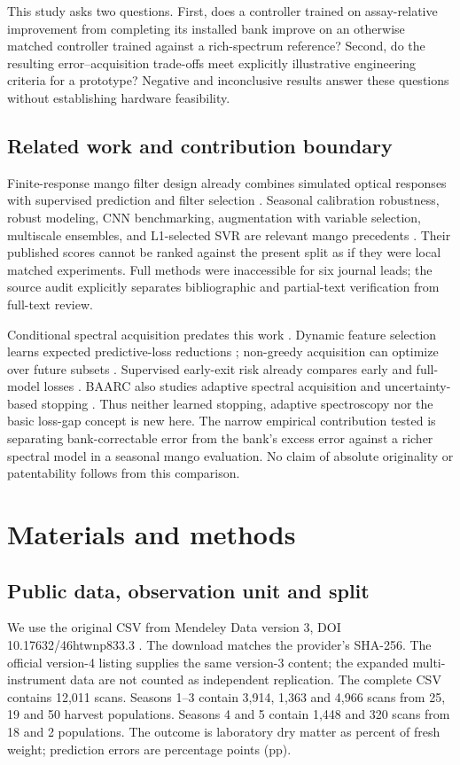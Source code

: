 \documentclass[11pt,a4paper]{article}
\begin{document}
This study asks two questions. First, does a controller trained on assay-relative improvement from completing its installed bank improve on an otherwise matched controller trained against a rich-spectrum reference? Second, do the resulting error--acquisition trade-offs meet explicitly illustrative engineering criteria for a prototype? Negative and inconclusive results answer these questions without establishing hardware feasibility.

\subsection{Related work and contribution boundary}
Finite-response mango filter design already combines simulated optical responses with supervised prediction and filter selection \citep{gutierrez2019}. Seasonal calibration robustness, robust modeling, CNN benchmarking, augmentation with variable selection, multiscale ensembles, and L1-selected SVR are relevant mango precedents \citep{anderson2020,mishra2023,walsh2024,yang2025,yang2026,ma2026}. Their published scores cannot be ranked against the present split as if they were local matched experiments. Full methods were inaccessible for six journal leads; the source audit explicitly separates bibliographic and partial-text verification from full-text review.

Conditional spectral acquisition predates this work \citep{huang2015}. Dynamic feature selection learns expected predictive-loss reductions \citep{covert2023}; non-greedy acquisition can optimize over future subsets \citep{valancius2024}. Supervised early-exit risk already compares early and full-model losses \citep{jazbec2024}. BAARC also studies adaptive spectral acquisition and uncertainty-based stopping \citep{baarc2026}. Thus neither learned stopping, adaptive spectroscopy nor the basic loss-gap concept is new here. The narrow empirical contribution tested is separating bank-correctable error from the bank's excess error against a richer spectral model in a seasonal mango evaluation. No claim of absolute originality or patentability follows from this comparison.

\section{Materials and methods}
\subsection{Public data, observation unit and split}
We use the original CSV from Mendeley Data version 3, DOI 10.17632/46htwnp833.3 \citep{andersondata2024}. The download matches the provider's SHA-256. The official version-4 listing supplies the same version-3 content; the expanded multi-instrument data are not counted as independent replication. The complete CSV contains 12,011 scans. Seasons 1--3 contain 3,914, 1,363 and 4,966 scans from 25, 19 and 50 harvest populations. Seasons 4 and 5 contain 1,448 and 320 scans from 18 and 2 populations. The outcome is laboratory dry matter as percent of fresh weight; prediction errors are percentage points (pp).
\end{document}
